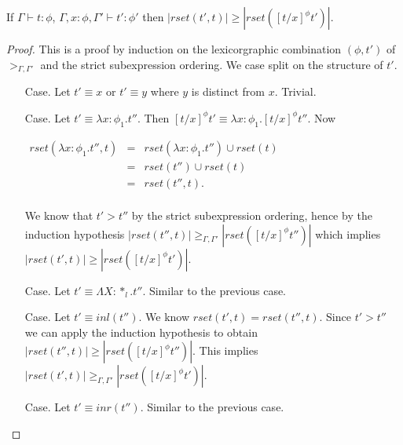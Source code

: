 \begin{lemma}
  \label{lemma:redex_preserving_ssf}
  If $\Gamma \vdash t : \phi$, $\Gamma, x:\phi, \Gamma' \vdash t':\phi'$ then
  $|rset(t', t)| \geq |rset([t/x]^\phi t')|$.
\end{lemma}
\begin{proof}
  This is a proof by induction on the lexicorgraphic combination
$(\phi, t')$ of $>_{\Gamma,\Gamma'}$ and the strict subexpression ordering.
We case split on the structure of $t'$.  
\begin{itemize}
\item[Case.] Let $t' \equiv x$ or $t' \equiv y$ where $y$ is distinct from $x$.  Trivial. 
  
\item[Case.] Let $t' \equiv \lambda x:\phi_1.t''$.  Then $[t/x]^\phi t' \equiv \lambda x:\phi_1.[t/x]^\phi t''$.
  Now 
  \begin{center}
    \begin{math}
      \begin{array}{lll}
        rset(\lambda x:\phi_1.t'', t) & = & rset(\lambda x:\phi_1.t'') \cup rset(t)\\
        & = & rset(t'') \cup rset(t)\\
        & = & rset(t'', t).\\
      \end{array}
    \end{math}
  \end{center}
  We know that $t' > t''$ by the strict subexpression ordering, hence by the induction hypothesis
  $|rset(t'', t)| \geq_{\Gamma,\Gamma'} |rset([t/x]^\phi t'')|$ which implies $|rset(t', t)| \geq |rset([t/x]^\phi t')|$.
  
\item[Case.] Let $t' \equiv \Lambda X:*_l.t''$.  Similar to the previous case.
  
\item[Case.] Let $t' \equiv inl(t'')$. We know $rset(t', t) = rset(t'', t)$.  Since $t' > t''$ we can apply
  the induction hypothesis to obtain $|rset(t'', t)| \geq |rset([t/x]^\phi t'')|$.  This implies
  $|rset(t', t)| \geq_{\Gamma,\Gamma'} |rset([t/x]^\phi t')|$.
  
\item[Case.] Let $t' \equiv inr(t'')$. Similar to the previous case.
  

\end{itemize}
\end{proof}
